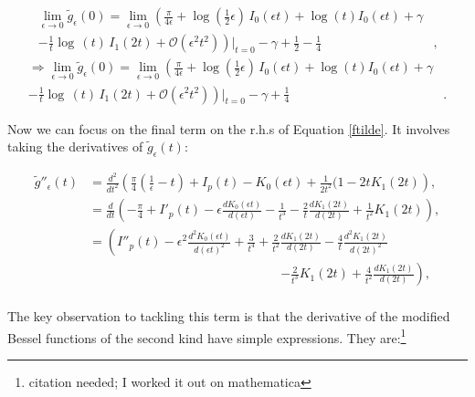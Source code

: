 \documentclass{article}
\numberwithin{equation}{section} %
\begin{document}
\begin{equation*}
\begin{split}
\lim_{\epsilon \rightarrow 0}\tilde{g}_\epsilon(0) = \lim_{\epsilon \rightarrow 0} \left( \frac{\pi}{4\epsilon} + \log(\frac{1}{2}\epsilon)\, I_0(\epsilon t) + \log(t)I_0(\epsilon t) + \gamma \right.&\\
\left. - \frac{1}{t} \log\,(t) \,I_1(2t) + \mathcal{O}(\epsilon^2t^2) \right)\bigg\vert_{t=0} -\gamma + \frac{1}{2} - \frac{1}{4}&,
\end{split}
\end{equation*}
\begin{equation}
\begin{split}
\Rightarrow \lim_{\epsilon \rightarrow 0}\tilde{g}_\epsilon(0) = \lim_{\epsilon \rightarrow 0} \left( \frac{\pi}{4\epsilon} + \log(\frac{1}{2}\epsilon)\, I_0(\epsilon t) + \log(t)I_0(\epsilon t) + \gamma \right.&\\
\left. - \frac{1}{t} \log\,(t) \,I_1(2t) + \mathcal{O}(\epsilon^2t^2) \right)\bigg\vert_{t=0} -\gamma + \frac{1}{4}&.
\end{split}
\label{lim 21}
\end{equation}

Now we can focus on the final term on the r.h.s of Equation \ref{ftilde}. It involves taking the derivatives of $\tilde{g}_\epsilon(t)$:

\begin{equation}
\begin{split}
\tilde{g}''_\epsilon(t) &= \frac{d^2}{dt^2}\left( \frac{\pi}{4}\left( \frac{1}{\epsilon} - t \right) + I_p(t) - K_0(\epsilon t) + \frac{1}{2t^2}(1 - 2tK_1(2t) \right),\\
&=\frac{d}{dt}\left(-\frac{\pi}{4} + I'_p(t) - \epsilon\frac{dK_0(\epsilon t)}{d(\epsilon t)} - \frac{1}{t^3} - \frac{2}{t}\frac{dK_1(2t)}{d(2t)} + \frac{1}{t^2}K_1(2t) \right),\\
&=\left(I''_p(t) - \epsilon^2\frac{d^2K_0(\epsilon t)}{d(\epsilon t)^2} + \frac{3}{t^4} + \frac{2}{t^2}\frac{dK_1(2t)}{d(2t)} - \frac{4}{t}\frac{d^2K_1(2t)}{d(2t)^2} \right.\\
& \quad \quad \quad \quad \quad \quad \quad \quad \quad \quad \quad \quad \quad \quad \quad  \left. - \frac{2}{t^3}K_1(2t) + \frac{4}{t^2}\frac{dK_1(2t)}{d(2t)}  \right),\\
\end{split}
\label{lim 3}
\end{equation}

\noindent The key observation to tackling this term is that the derivative of the modified Bessel functions of the second kind have simple expressions. They are:\footnote{citation needed; I worked it out on mathematica} 
\end{document}
